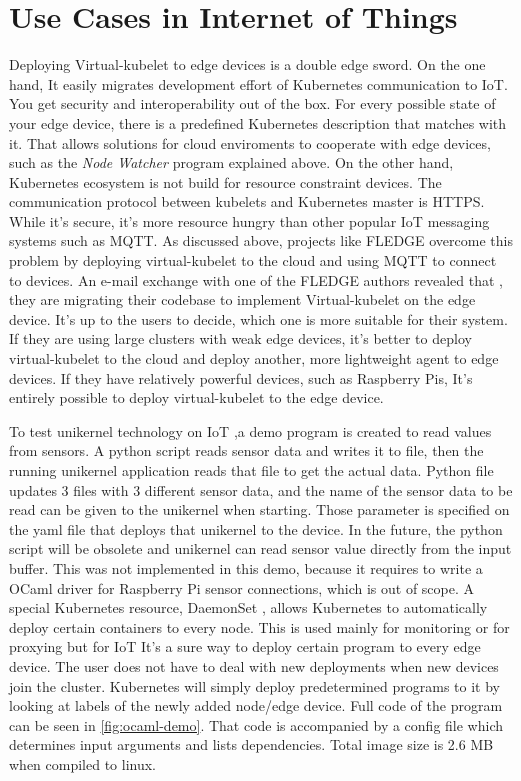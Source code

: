 \section{Use Cases in Internet of Things}

Deploying Virtual-kubelet to edge devices is a double edge sword. On the one hand, It easily migrates development effort of Kubernetes communication to IoT. You get security and interoperability out of the box. For every possible state of your edge device, there is a predefined Kubernetes description that matches with it. That allows solutions for cloud enviroments to cooperate with edge devices, such as the \textit{Node Watcher} program explained above. On the other hand, Kubernetes ecosystem is not build for resource constraint devices. The communication protocol between kubelets and Kubernetes master is HTTPS. While it's secure, it's more resource hungry than other popular IoT messaging systems such as MQTT. As discussed above, projects like FLEDGE overcome this problem by deploying virtual-kubelet to the cloud and using MQTT to connect to devices. An e-mail exchange with one of the FLEDGE authors revealed that , they are migrating their codebase to implement Virtual-kubelet on the edge device. It's up to the users to decide, which one is more suitable for their system. If they are using large clusters with weak edge devices, it's better to deploy virtual-kubelet to the cloud and deploy another, more lightweight agent to edge devices. If they have relatively powerful devices, such as Raspberry Pis, It's entirely possible to deploy virtual-kubelet to the edge device.

To test unikernel technology on IoT ,a demo program is created to read values from sensors. A python script reads sensor data and writes it to file, then the running unikernel application reads that file to get the actual data. Python file updates 3 files with 3 different sensor data, and the name of the sensor data to be read can be given to the unikernel when starting. Those parameter is specified on the yaml file that deploys that unikernel to the device. In the future, the python script will be obsolete and unikernel can read sensor value directly from the input buffer. This was not implemented in this demo, because it requires to write a OCaml driver for Raspberry Pi sensor connections, which is out of scope. A special Kubernetes resource, DaemonSet , allows Kubernetes to automatically deploy certain containers to every node. This is used mainly for monitoring or for proxying but for IoT It's a sure way to deploy certain program to every edge device. The user does not have to deal with new deployments when new devices join the cluster. Kubernetes will simply deploy predetermined programs to it by looking at labels of the newly added node/edge device. Full code of the program can be seen in \ref{fig:ocaml-demo}. That code is accompanied by a config file which determines input arguments and lists dependencies. Total image size is 2.6 MB when compiled to linux.

